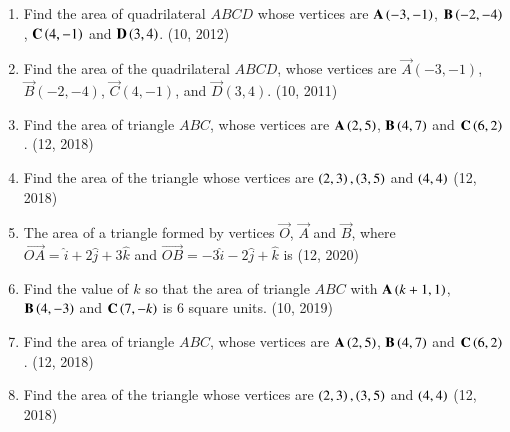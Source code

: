 \begin{enumerate}[label=\thesubsection.\arabic*, ref=\thesubsection.\theenumi]
\item Find the area of quadrilateral $ABCD$ whose vertices are $\mathbf{A}\left(-3, -1\right)$,  $\mathbf{B}\left(-2, -4\right)$,  $\mathbf{C}\left(4, -1\right)$ and $\mathbf{D}\left(3, 4\right)$.
\hfill (10,  2012)
\item Find the area of the quadrilateral $ABCD$,  whose vertices are $\vec{A}(-3,  -1)$,  $\vec{B}(-2,  -4)$,  $\vec{C}(4,  -1)$,  and $\vec{D}(3,  4)$.
\hfill (10,  2011)
\item Find the area of triangle $ABC$,  whose vertices are $\mathbf{A}\left(2,  5\right)$,  $\mathbf{B}\left(4,  7\right)$ and $\mathbf{C}\left(6,  2\right)$.
\hfill (12,  2018)
\item Find the area of the triangle whose vertices are $\left(2, 3\right), \left(3, 5\right)$ and $\left(4, 4\right)$
\hfill (12,  2018)
\item The area of a triangle formed by vertices $\vec{O}$,  $\vec{A}$ and $\vec{B}$,  where $\overrightarrow{OA}= \hat{i}+2 \hat{j}+3\hat{k}$ and $\overrightarrow{OB}= -3\hat{i} - 2\hat{j} + \hat{k}$ is
\hfill (12,  2020)
\item Find the value of $k$ so that the area of triangle $ABC$ with $\mathbf{A}\left(k + 1,  1\right)$,  $\mathbf{B}\left(4,  -3\right)$ and $\mathbf{C}\left(7,  -k\right)$ is $6$ square units.
\hfill (10,  2019)
\item Find the area of triangle $ABC$,  whose vertices are $\mathbf{A}\left(2,  5\right)$,  $\mathbf{B}\left(4,  7\right)$ and $\mathbf{C}\left(6,  2\right)$.
\hfill (12,  2018)
\item Find the area of the triangle whose vertices are $\left(2, 3\right), \left(3, 5\right)$ and $\left(4, 4\right)$
\hfill (12,  2018)

\end{enumerate}
